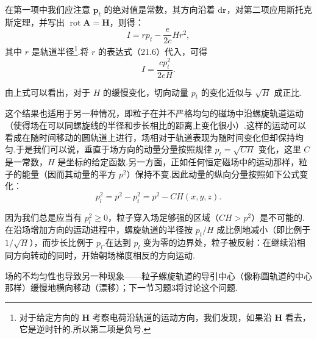 在第一项中我们应注意 $\boldsymbol{p}_t$ 的绝对值是常数，其方向沿着 $\mathrm{d}\boldsymbol{r}$，对第二项应用斯托克斯定理，并写出
$\operatorname{rot}\boldsymbol{A}=\boldsymbol{H}$，则得：
\begin{equation*}
  I=rp_t-\frac{e}{2c}Hr^2,
\end{equation*}
其中 $r$ 是轨道半径\footnote{对于给定方向的 $\boldsymbol{H}$ 考察电荷沿轨道的运动方向，我们发现，如果沿 $\boldsymbol{H}$ 看去，它是逆时针的.所以第二项是负号.}.将 $r$ 的表达式（21.6）代入，可得
\begin{equation}
  I=\frac{cp_t^2}{2eH}.
\end{equation}

由上式可以看出，对于 $H$ 的缓慢变化，切向动量 $p_t$ 的变化近似与 $\sqrt{H}$ 成正比.

这个结果也适用于另一种情况，即粒子在并不严格均匀的磁场中沿螺旋轨道运动（使得场在可以同螺旋线的半径和步长相比的距离上变化很小）.这样的运动可以看成在随时间移动的圆轨道上进行，场相对于轨道表现为随时间变化但却保持均匀.于是我们可以说，垂直于场方向的动量分量按照规律
$p_t=\sqrt{CH}$ 变化，这里 $C$ 是一常数，$H$ 是坐标的给定函数.另一方面，正如任何恒定磁场中的运动那样，粒子的能量（因而其动量的平方
$p^2$）保持不变.因此动量的纵向分量按照如下公式变化：
\begin{equation}
  p_l^2=p^2-p_t^2=p^2-CH(x,y,z).
\end{equation}

因为我们总是应当有 $p_l^2\geqslant0$，粒子穿入场足够强的区域（$CH>p^2$）是不可能的.在沿场增加方向的运动进程中，螺旋轨道的半径按
$p_t/H$ 成比例地减小（即比例于 $1/\sqrt{H}$），而步长比例于 $p_l$.在达到 $p_l$ 变为零的边界处，粒子被反射：在继续沿相同方向转动的同时，开始朝场梯度相反的方向运动.

场的不均匀性也导致另一种现象——粒子螺旋轨道的导引中心（像称圆轨道的中心那样）缓慢地横向移动（漂移）；下一节习题3将讨论这个问题.

